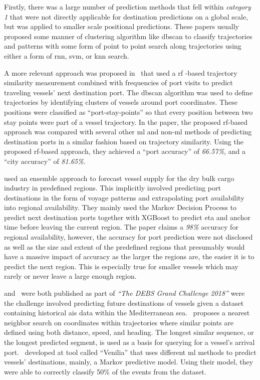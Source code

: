 
Firstly, there was a large number of prediction methods that fell within \textit{category 1} that were not directly applicable for destination predictions on a global scale, but was applied to smaller scale positional predictions. These papers usually proposed some manner of clustering algorithm like \acrshort{dbscan} to classify trajectories and patterns with some form of point to point search along trajectories using either a form of \acrfull{rnn}, \acrfull{svm}, or \acrfull{knn} search.

A more relevant approach was proposed in~\cite{Zhang2020AISApproach} that used a \acrfull{rf} -based trajectory similarity measurement combined with frequencies of port visits to predict traveling vessels' next destination port. The \acrshort{dbscan} algorithm was used to define trajectories by identifying clusters of vessels around port coordinates. These positions were classified as ``port-stay-points'' so that every position between two stay points were part of a vessel trajectory. In the paper, the proposed \acrshort{rf}-based approach was compared with several other \acrshort{ml} and non-\acrshort{ml} methods of predicting destination ports in a similar fashion based on trajectory similarity. Using the proposed \acrshort{rf}-based approach, they achieved a ``port accuracy'' of \textit{66.57\%}, and a ``city accuracy'' of \textit{81.65\%}.

\cite{lechtenberg2019} used an ensemble approach to forecast vessel supply for the dry bulk cargo industry in predefined regions. This implicitly involved predicting port destinations in the form of voyage patterns and extrapolating port availability into regional availability. They mainly used the Markov Decision Process to predict next destination ports together with XGBoost to predict \acrshort{eta} and anchor time before leaving the current region. The paper claims a \textit{98\%} accuracy for regional availability, however, the accuracy for port prediction were not disclosed as well as the size and extent of the predefined regions that presumably would have a massive impact of accuracy as the larger the regions are, the easier it is to predict the next region. This is especially true for smaller vessels which may rarely or never leave a large enough region.

\cite{Rosca2018GrandRoutes} and~\cite{Bachar2018GrandDestination} were both published as part of \textit{``The DEBS Grand Challenge 2018''} were the challenge involved predicting future destinations of vessels given a dataset containing historical \acrshort{ais} data within the Mediterranean sea.~\cite{Rosca2018GrandRoutes} proposes a nearest neighbor search on coordinates within trajectories where similar points are defined using both distance, speed, and heading. The longest similar sequence, or the longest predicted segment, is used as a basis for querying for a vessel's arrival port.~\cite{Bachar2018GrandDestination} developed at tool called ``Venilia'' that uses different \acrshort{ml} methods to predict vessels' destinations, mainly, a Markov predictive model. Using their model, they were able to correctly classify 50\% of the events from the dataset.

